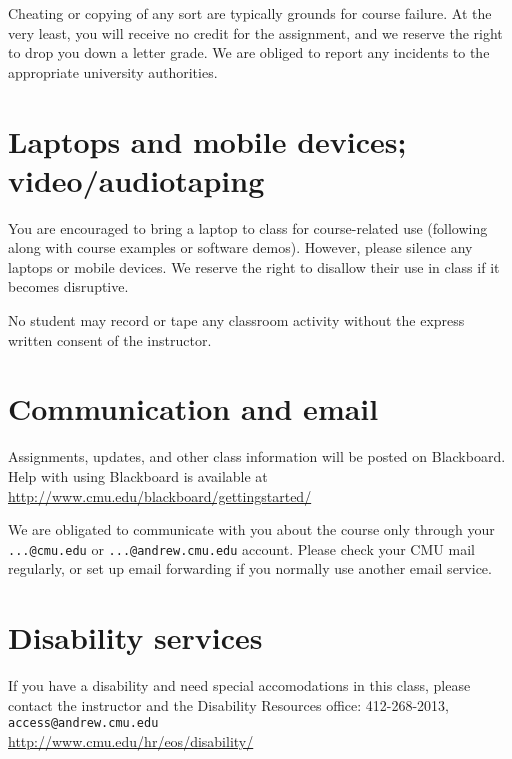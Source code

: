 \documentclass[12pt]{article}
\begin{document}
Cheating or copying of any sort are typically grounds for course failure. At the very least, you will receive no credit for the assignment, and we reserve the right to drop you down a letter grade. We are obliged to report any incidents to the appropriate university authorities.

\section*{Laptops and mobile devices; video/audiotaping}
You are encouraged to bring a laptop to class for course-related use (following along with course examples or software demos). However, please silence any laptops or mobile devices. We reserve the right to disallow their use in class if it becomes disruptive.

No student may record or tape any classroom activity without the express written consent of the instructor.

\section*{Communication and email}
Assignments, updates, and other class information will be posted on Blackboard. Help with using Blackboard is available at \url{http://www.cmu.edu/blackboard/gettingstarted/}

We are obligated to communicate with you about the course only through your \texttt{...@cmu.edu} or \texttt{...@andrew.cmu.edu} account. Please check your CMU mail regularly, or set up email forwarding if you normally use another email service.

\section*{Disability services}
If you have a disability and need special accomodations in this class, please contact the instructor and the Disability Resources office: 412-268-2013, \texttt{access@andrew.cmu.edu}\\
\url{http://www.cmu.edu/hr/eos/disability/}


\newpage
\end{document}
